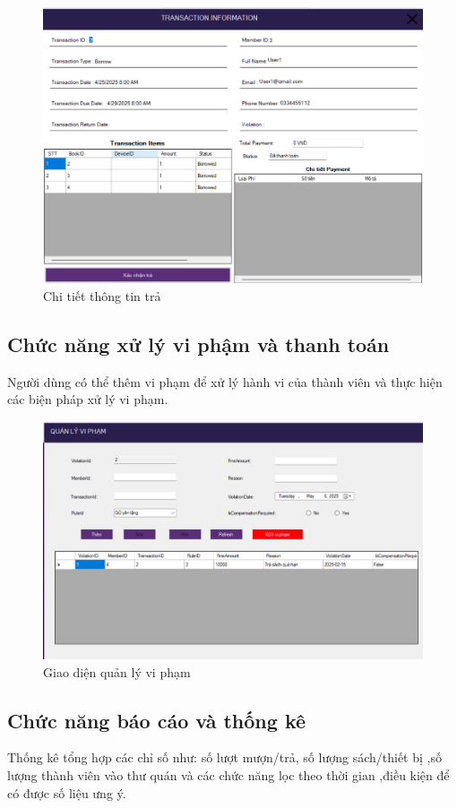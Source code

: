 \documentclass{article}
\begin{document}
\begin{figure} [H]
    \centering
    \includegraphics[width=0.8\linewidth]{images//Winform/cn ql gd2.png}
    \caption{Chi tiết thông tin trả}
    \label{fig:enter-label}
\end{figure}

\subsection{Chức năng xử lý vi phậm và thanh toán}
Người dùng có thể thêm vi phạm để xử lý hành vi của thành viên và thực hiện các biện pháp xử lý vi phạm.

\begin{figure} [H]
    \centering
    \includegraphics[width=0.8\linewidth]{images//Winform/cn ql vp1.png}
    \caption{Giao diện quản lý vi phạm}
    \label{fig:enter-label}
\end{figure}

\subsection{Chức năng báo cáo và thống kê}
Thống kê tổng hợp các chỉ số như: số lượt mượn/trả, số lượng sách/thiết bị ,số lượng thành viên vào thư quán và các chức năng lọc theo thời gian ,điều kiện để có được số liệu ưng ý.
\end{document}
